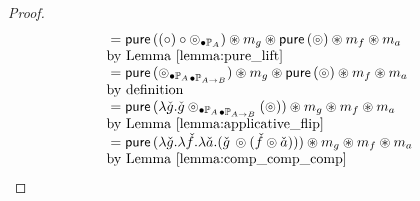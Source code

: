 \begin{proof}
$$\begin{array}{ll}
{}=   \mathsf{pure}\, ((\circ) \circ \mathbin{\circledcirc_{\bullet \mathbb{P}_{A}}}) \circledast m_g \circledast \mathsf{pure}\, (\circledcirc) \circledast m_f \circledast m_a\\
 \mbox{by Lemma \ref{lemma:pure_lift}}\\
{}=    \mathsf{pure}\, (\mathbin{\mathbin{\circledcirc_{\bullet \mathbb{P}_{A}}}_{\bullet \mathbb{P}_{A\rightarrow B}}}) \circledast m_g \circledast \mathsf{pure}\, (\circledcirc) \circledast m_f  \circledast m_a\\
 \mbox{by definition}\\
{}= \mathsf{pure}\, (\lambda \check{g} . \check{g} \mathbin{\mathbin{\circledcirc_{\bullet \mathbb{P}_{A}}}_{\bullet \mathbb{P}_{A\rightarrow B}}} (\circledcirc) ) \circledast m_g  \circledast m_f  \circledast m_a\\
 \mbox{by Lemma \ref{lemma:applicative_flip}}\\
{}=  \mathsf{pure}\, (\lambda \check{g} . \lambda \check{f}. \lambda \check{a} . (\check{g}\, \circledcirc (\check{f} \circledcirc \check{a})) ) \circledast m_g  \circledast m_f  \circledast m_a\\
 \mbox{by Lemma \ref{lemma:comp_comp_comp}}\\
\end{array}
$$
\end{proof}

\newpage


